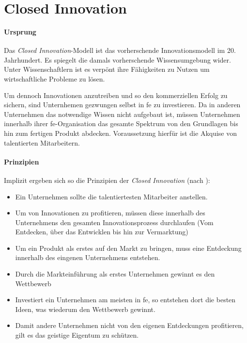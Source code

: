 \section{Closed Innovation}\label{sec:grundlagen-closed}

\paragraph{Ursprung}
Das \textit{Closed Innovation}-Modell ist das vorherschende Innovationsmodell im 20. Jahrhundert.
Es spiegelt die damals vorherschende Wissensumgebung wider.
Unter Wissenschaftlern ist es verpönt ihre Fähigkeiten zu Nutzen um wirtschaftliche Probleme zu lösen.

Um dennoch Innovationen anzutreiben und so den kommerziellen Erfolg zu sichern,
sind Unternhemen gezwungen selbst in \ac{fe} zu investieren.
Da in anderen Unternehmen das notwendige Wissen nicht aufgebaut ist,
müssen Unternehmen innerhalb ihrer \ac{fe}-Organisation das gesamte Spektrum von den Grundlagen bis hin zum fertigen Produkt abdecken.
Voraussetzung hierfür ist die Akquise von talentierten Mitarbeitern.


\paragraph{Prinzipien}
Implizit ergeben sich so die Prinzipien der \textit{Closed Innovation} (nach \cite[19]{herzog2011}):
\begin{itemize}
    \item Ein Unternehmen sollte die talentiertesten Mitarbeiter anstellen.
    \item Um von Innovationen zu profitieren, müssen diese innerhalb des Unternehmens den gesamten Innovationsprozess durchlaufen (Vom Entdecken, über das Entwicklen bis hin zur Vermarktung)
    \item Um ein Produkt als erstes auf den Markt zu bringen, muss eine Entdeckung innerhalb des eingenen Unternehmens entstehen.
    \item Durch die Markteinführung als erstes Unternehmen gewinnt es den Wettbewerb
    \item Investiert ein Unternehmen am meisten in \ac{fe}, so entstehen dort die besten Ideen, was wiederum den Wettbewerb gewinnt.
    \item Damit andere Unternehmen nicht von den eigenen Entdeckungen profitieren, gilt es das geistige Eigentum zu schützen.
\end{itemize}

